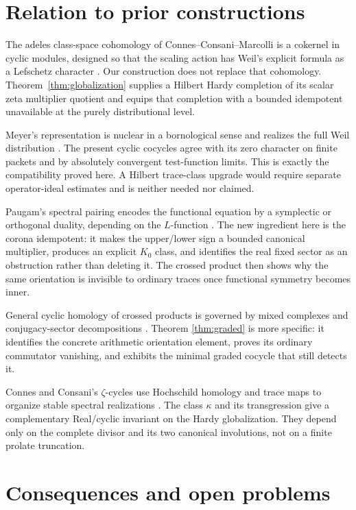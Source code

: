 \documentclass[11pt]{article}
\theoremstyle{definition}
\theoremstyle{remark}
\begin{document}
\section{Relation to prior constructions}

The adeles class-space cohomology of Connes--Consani--Marcolli is a cokernel in
cyclic modules, designed so that the scaling action has Weil's explicit formula
as a Lefschetz character \cite{CCM2007}.  Our construction does not replace that
cohomology.  Theorem~\ref{thm:globalization} supplies a Hilbert Hardy completion
of its scalar zeta multiplier quotient and equips that completion with a
bounded idempotent unavailable at the purely distributional level.

Meyer's representation is nuclear in a bornological sense and realizes the
full Weil distribution \cite{Meyer2005}.  The present cyclic cocycles agree with
its zero character on finite packets and by absolutely convergent test-function
limits.  This is exactly the compatibility proved here.  A Hilbert trace-class
upgrade would require separate operator-ideal estimates and is neither needed
nor claimed.

Paugam's spectral pairing encodes the functional equation by a symplectic or
orthogonal duality, depending on the $L$-function \cite{Paugam2009}.  The new
ingredient here is the corona idempotent: it makes the upper/lower sign a
bounded canonical multiplier, produces an explicit $K_0$ class, and identifies
the real fixed sector as an obstruction rather than deleting it.  The crossed
product then shows why the same orientation is invisible to ordinary traces
once functional symmetry becomes inner.

General cyclic homology of crossed products is governed by mixed complexes and
conjugacy-sector decompositions \cite{CarboniGuccione2009}.  Theorem
\ref{thm:graded} is more specific: it identifies the concrete arithmetic
orientation element, proves its ordinary commutator vanishing, and exhibits the
minimal graded cocycle that still detects it.

Connes and Consani's $\zeta$-cycles use Hochschild homology and trace maps to
organize stable spectral realizations \cite{ConnesConsani2023}.  The class
$\kappa$ and its transgression give a complementary Real/cyclic invariant on
the Hardy globalization.  They depend only on the complete divisor and its two
canonical involutions, not on a finite prolate truncation.

\section{Consequences and open problems}
\end{document}
